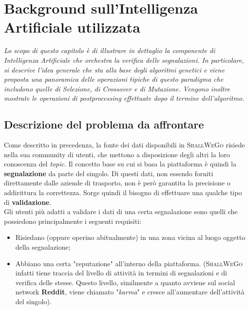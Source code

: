 \chapter{Background sull'Intelligenza Artificiale utilizzata} %
%

\begin{citazione}
    \textit{Lo scopo di questo capitolo è di illustrare in dettaglio la componente di Intelligenza Artificiale che orchestra la verifica delle segnalazioni. In particolare, si descrive l'idea generale che sta alla base degli algoritmi genetici e viene proposta una panoramica delle operazioni tipiche di questo paradigma che includono quelle di Selezione, di Crossover e di Mutazione. Vengono inoltre mostrate le operazioni di postprocessing effettuate dopo il termine dell'algoritmo.}
\end{citazione}

\newpage

\section{Descrizione del problema da affrontare}
    Come descritto in precedenza, la fonte dei dati disponibili in \textsc{ShallWeGo} risiede nella sua community di utenti, che mettono a disposizione degli altri la loro conoscenza del \textit{topic}. Il concetto base su cui si basa la piattaforma è quindi la \textbf{segnalazione} da parte del singolo. Di questi dati, non essendo forniti direttamente dalle aziende di trasporto, non è però garantita la precisione o addirittura la correttezza. Sorge quindi il bisogno di effettuare una qualche tipo di \textbf{validazione}. \\
    Gli utenti più adatti a validare i dati di una certa segnalazione sono quelli che possiedono principalmente i seguenti requisiti:
    \begin{itemize}
        \item Risiedano (oppure operino abitualmente) in una zona vicina al luogo oggetto della segnalazione;
        \item Abbiano una certa "reputazione" all'interno della piattaforma. (\textsc{ShallWeGo} infatti tiene traccia del livello di attività in termini di segnalazioni e di verifica delle stesse. Questo livello, similmente a quanto avviene sul social network \textbf{Reddit}, viene chiamato "\textit{karma}" e cresce all'aumentare dell'attività del singolo).
    \end{itemize}

